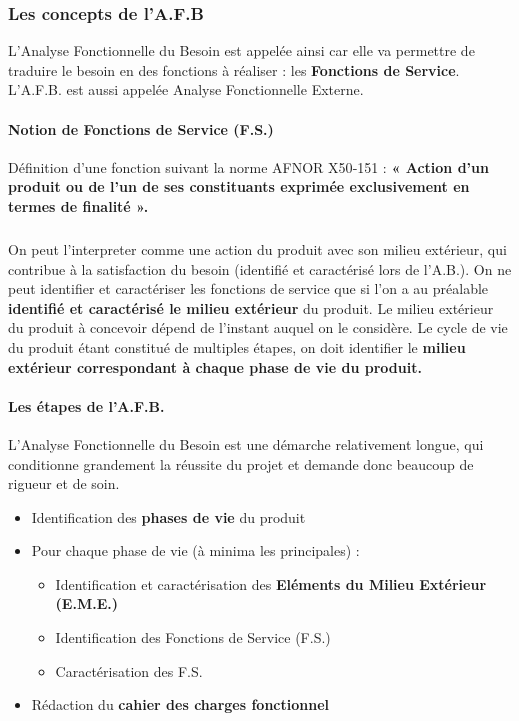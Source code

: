 \subsubsection{Les concepts de l’A.F.B}
L’Analyse Fonctionnelle du Besoin est appelée ainsi car elle va permettre de traduire le besoin en des fonctions à réaliser : les \textbf{Fonctions de Service}. L'A.F.B. est aussi appelée Analyse Fonctionnelle Externe.
\paragraph{Notion de Fonctions de Service (F.S.)}
Définition d’une fonction suivant la norme AFNOR X50‐151 :
\textbf{« Action d'un produit ou de l'un de ses constituants exprimée exclusivement en termes de finalité ».}
\subparagraph{}
On peut l'interpreter comme une action du produit avec son milieu extérieur, qui contribue à la satisfaction du besoin (identifié et caractérisé lors de l’A.B.). On ne peut identifier et caractériser les fonctions de service que si l’on a au préalable \textbf{identifié et caractérisé le milieu extérieur} du produit. Le milieu extérieur du produit à concevoir dépend de l’instant auquel on le considère. Le cycle de vie du produit étant constitué de multiples étapes, on doit identifier le \textbf{milieu extérieur correspondant à chaque phase de vie du produit.}

\paragraph{Les étapes de l’A.F.B.}
L’Analyse Fonctionnelle du Besoin est une démarche relativement longue, qui conditionne
grandement la réussite du projet et demande donc beaucoup de rigueur et de soin.
\begin{itemize}
    \item Identification des \textbf{phases de vie} du produit
    \item Pour chaque phase de vie (à minima les principales) :
    \begin{itemize}
        \item Identification et caractérisation des \textbf{Eléments du Milieu Extérieur (E.M.E.)}
        \item Identification des Fonctions de Service (F.S.)
        \item Caractérisation des F.S.
    \end{itemize}
    \item Rédaction du \textbf{cahier des charges fonctionnel}
\end{itemize}


